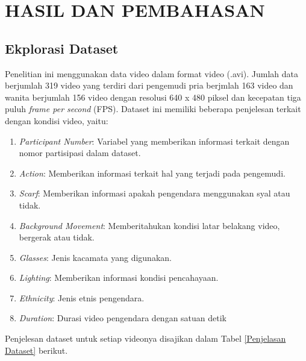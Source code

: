 
\chapter{HASIL DAN PEMBAHASAN}

\section{Ekplorasi Dataset}

    Penelitian ini menggunakan data video dalam format video (.avi). Jumlah data berjumlah 319 video yang terdiri dari 
    pengemudi pria berjmlah 163 video dan wanita berjumlah 156 video dengan resolusi 640 x 480 piksel dan kecepatan tiga 
    puluh \textit{frame per second} (FPS). Dataset ini memiliki beberapa penjelesan terkait dengan kondisi video, yaitu:
    
    \begin{enumerate}
        \item \textit{Participant Number}: Variabel yang memberikan informasi terkait dengan nomor partisipasi dalam dataset.
        \item \textit{Action}: Memberikan informasi terkait hal yang terjadi pada pengemudi.
        \item \textit{Scarf}:  Memberikan informasi apakah pengendara menggunakan syal atau tidak.
        \item \textit{Background Movement}: Memberitahukan kondisi latar belakang video, bergerak atau tidak.

         \item  \textit{Glasses}: Jenis kacamata yang digunakan.
        
        \item \textit{Lighting}: Memberikan informasi kondisi pencahayaan.
        
        \item  \textit{Ethnicity}: Jenis etnis pengendara.

        \item  \textit{Duration}: Durasi video pengendara dengan satuan detik
        
        
    \end{enumerate}

  


    Penjelesan dataset untuk setiap videonya disajikan dalam Tabel \ref{Penjelasan Dataset} berikut.

